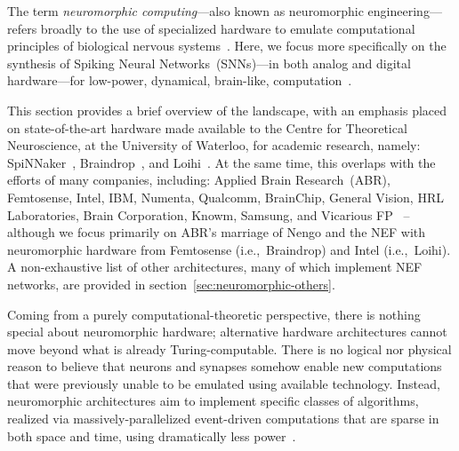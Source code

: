 The term \emph{neuromorphic computing}---also known as neuromorphic engineering---refers broadly to the use of specialized hardware to emulate computational principles of biological nervous systems~\citep{mead1989analog, liu2002analog}.
Here, we focus more specifically on the synthesis of Spiking Neural Networks~(SNNs)---in both analog and digital hardware---for low-power, dynamical, brain-like, computation~\citep{boahen2017neuromorph}.

This section provides a brief overview of the landscape, with an emphasis placed on state-of-the-art hardware made available to the Centre for Theoretical Neuroscience, at the University of Waterloo, for academic research, namely: SpiNNaker~\citep{furber2014spinnaker}, Braindrop~\citep{braindrop2019}, and Loihi~\citep{davies2018loihi}.
At the same time, this overlaps with the efforts of many companies, including: Applied Brain Research~(ABR), Femtosense, Intel, IBM, Numenta, Qualcomm, BrainChip, General Vision, HRL Laboratories, Brain Corporation, Knowm, Samsung, and Vicarious FP~\citep{marketreport2018, femtosense} -- although we focus primarily on ABR's marriage of Nengo and the NEF with neuromorphic hardware from Femtosense (i.e.,~Braindrop) and Intel (i.e.,~Loihi).
A non-exhaustive list of other architectures, many of which implement NEF networks, are provided in section~\ref{sec:neuromorphic-others}.

Coming from a purely computational-theoretic perspective, there is nothing special about neuromorphic hardware; alternative hardware architectures cannot move beyond what is already Turing-computable.
There is no logical nor physical reason to believe that neurons and synapses somehow enable new computations that were previously unable to be emulated using available technology.
Instead, neuromorphic architectures aim to implement specific classes of algorithms, realized via massively-parallelized event-driven computations that are sparse in both space and time, using dramatically less power~\citep{tang2017sparse}.

